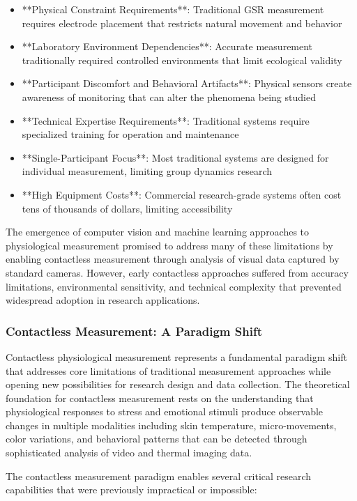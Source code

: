 \documentclass[12pt,a4paper]{report}
\begin{document}
\begin{itemize}
\item **Physical Constraint Requirements**: Traditional GSR measurement requires electrode placement that restricts natural
  movement and behavior
\item **Laboratory Environment Dependencies**: Accurate measurement traditionally required controlled environments that
  limit ecological validity
\item **Participant Discomfort and Behavioral Artifacts**: Physical sensors create awareness of monitoring that can alter
  the phenomena being studied
\item **Technical Expertise Requirements**: Traditional systems require specialized training for operation and maintenance
\item **Single-Participant Focus**: Most traditional systems are designed for individual measurement, limiting group
  dynamics research
\item **High Equipment Costs**: Commercial research-grade systems often cost tens of thousands of dollars, limiting
  accessibility

\end{itemize}
The emergence of computer vision and machine learning approaches to physiological measurement promised to address many
of these limitations by enabling contactless measurement through analysis of visual data captured by standard cameras.
However, early contactless approaches suffered from accuracy limitations, environmental sensitivity, and technical
complexity that prevented widespread adoption in research applications.

\subsubsection{Contactless Measurement: A Paradigm Shift}

Contactless physiological measurement represents a fundamental paradigm shift that addresses core limitations of
traditional measurement approaches while opening new possibilities for research design and data collection. The
theoretical foundation for contactless measurement rests on the understanding that physiological responses to stress and
emotional stimuli produce observable changes in multiple modalities including skin temperature, micro-movements, color
variations, and behavioral patterns that can be detected through sophisticated analysis of video and thermal imaging
data.

The contactless measurement paradigm enables several critical research capabilities that were previously impractical or
impossible:
\end{document}
